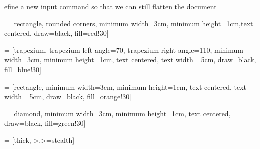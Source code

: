 \newenvironment{myRaggedRight}
  {\RaggedRight\setlength{\parindent}{15pt}} %
  {}






\let\estinput= define a new input command so that we can still flatten the document

\newcommand{\estwide}[3]{
		\vspace{.75ex}{
			\begin{tabular*}
			{\textwidth}{@{\hskip\tabcolsep\extracolsep\fill}l*{#2}{#3}}
			\toprule
			\estinput{#1}
			\bottomrule
			\addlinespace[.75ex]
			\end{tabular*}
			}
		}	

\newcommand{\estauto}[3]{
		\vspace{.75ex}{
			\begin{tabular}{l*{#2}{#3}}
			\toprule
			\estinput{#1}
			\bottomrule
			\addlinespace[.75ex]
			\end{tabular}
			}
		}

\newcommand{\specialcell}[2][c]{%
    \begin{tabular}[#1]{@{}c@{}}#2\end{tabular}
}



    
\usepackage{tikz}
\usetikzlibrary{shapes.geometric, arrows}

 = [rectangle, rounded corners, minimum width=3cm, minimum height=1cm,text centered, draw=black, fill=red!30]

 = [trapezium, trapezium left angle=70, trapezium right angle=110, minimum width=3cm, minimum height=1cm, text centered, text width =5cm, draw=black, fill=blue!30]

 = [rectangle, minimum width=3cm, minimum height=1cm, text centered, text width =5cm, draw=black, fill=orange!30]

 = [diamond, minimum width=3cm, minimum height=1cm, text centered, draw=black, fill=green!30]

 = [thick,->,>=stealth]
